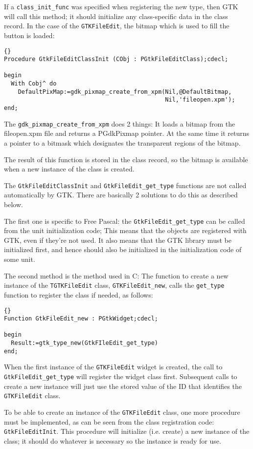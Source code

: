 \documentclass[10pt]{article}
\begin{document}
If a \lstinline|class_init_func| was specified when registering the new type,
then GTK will call this method; it should initialize any class-specific 
data in the class record. In the case of the \lstinline|GTKFileEdit|, the bitmap 
which is used to fill the button is loaded:
\begin{lstlisting}{}
Procedure GtkFileEditClassInit (CObj : PGtkFileEditClass);cdecl;
   
begin
  With Cobj^ do
    DefaultPixMap:=gdk_pixmap_create_from_xpm(Nil,@DefaultBitmap,
                                              Nil,'fileopen.xpm');
end;
\end{lstlisting}
The \lstinline|gdk_pixmap_create_from_xpm| does 2 things: It loads a bitmap
from the \textsf{fileopen.xpm} file and returns a PGdkPixmap pointer.
At the same time it returns a pointer to a bitmask which designates the
transparent regions of the bitmap.

The result of this function is stored in the class record, so the bitmap
is available when a new instance of the class is created.

The \lstinline|GtkFileEditClassInit| and \lstinline|GtkFileEdit_get_type| 
functions are not called automatically by GTK. There are basically
2 solutions to do this as described below.

The first one is specific to Free Pascal: the \lstinline|GtkFileEdit_get_type|
can be called from the unit initialization code; This means that the objects 
are registered with GTK, even if they're not used. It also means that the
GTK library must be initialized first, and hence should also be initialized
in the initialization code of some unit.

The second method is the method used in C: The function to create a new
instance of the \lstinline|TGTKFileEdit| class, \lstinline|GTKFileEdit_new|,
calls the \lstinline|get_type| function to register the class if needed,
as follows:
\begin{lstlisting}{}
Function GtkFileEdit_new : PGtkWidget;cdecl;

begin
  Result:=gtk_type_new(GtkFIleEdit_get_type)
end;
\end{lstlisting}
When the first instance of the \lstinline|GTKFileEdit| widget is created, the 
call to \lstinline|GtkFileEdit_get_type| will register the widget class 
first. Subsequent calls to create a new instance will just use the stored 
value of the ID that identifies the \lstinline|GTKFileEdit| class.

To be able to create an instance of the \lstinline|GTKFileEdit| class, one
more procedure must be implemented, as can be seen from the class
registration code: \lstinline|GtkFileEditInit|. This procedure will 
initialize (i.e. create) a new instance of the class; it should do
whatever is necessary so the instance is ready for use.
\end{document}
